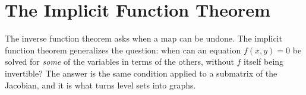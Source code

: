 \chapter{The Implicit Function Theorem}
\label{ch:implicit_function_theorem}

The inverse function theorem asks when a map can be undone. The implicit function theorem
generalizes the question: when can an equation $f(x,y) = 0$ be solved for \emph{some} of the
variables in terms of the others, without $f$ itself being invertible? The answer is the same
condition applied to a submatrix of the Jacobian, and it is what turns level sets into graphs.



